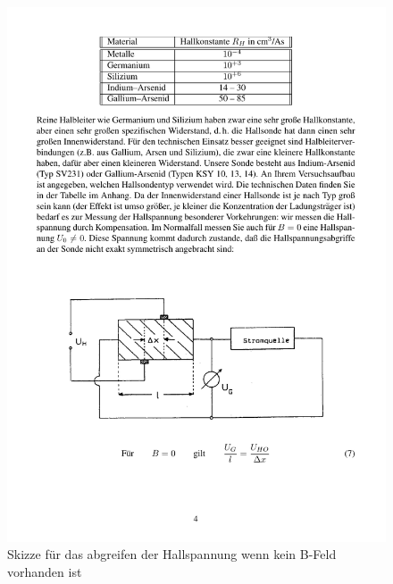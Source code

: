 \documentclass[12pt]{scrartcl}
\begin{document}
\begin{enumerate}
\begin{enumerate}
\begin{figure}[htbp] 
	  \centering
	    \includegraphics[trim = 1mm 40mm 1mm 105mm, clip, scale = 1]{U0H.pdf}
	  	\caption[Skizze für das abgreifen der Hallspannung wenn kein B-Feld vorhanden ist]{Skizze für das abgreifen der Hallspannung wenn kein B-Feld vorhanden ist\footnotemark}
	  \label{fig:U0H}
	\end{figure}
	\newpage


\end{enumerate}
\end{enumerate}
\end{document}
